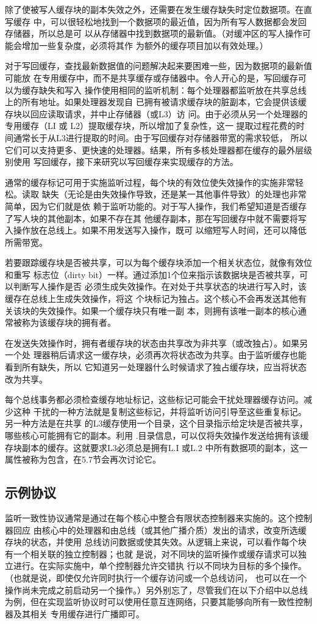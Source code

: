 除了使被写人缓存块的副本失效之外，还需要在发生缓存缺失时定位数据项。在直写缓存
中，可以很轻松地找到一个数据项的最近值，因为所有写人数据都会发回存储器，所以总是可
以从存储器中找到数据项的最新值。（对缓冲区的写人操作可能会增加一些复杂度，必须将其作
为额外的缓存项目加以有效处理。）

对于写回缓存，查找最新数据值的问题解决起来要困难一些，因为数据项的最新值可能放
在专用缓存中，而不是共享缓存或存储器中。令人开心的是，写回缓存可以为缓存缺失和写入
操作使用相同的监听机制：每个处理器都监听放在共享总线上的所有地址。如果处理器发现自
已拥有被请求缓存块的脏副本，它会提供该缓存块以回应读取请求，并中止存储器（或L3）访
问。由于必须从另一个处理器的专用缓存（LI 或 L2）提取缓存块，所以增加了复杂性，这一
提取过程花费的时间通常长于从L3进行提取的时间。由于写回缓存对存储器带宽的需求较低，
所以它们可以支持更多、更快速的处理器。结果，所有多核处理器都在缓存的最外层级别使用
写回缓存，接下来研究以写回缓存来实现缓存的方法。

通常的缓存标记可用于实施监听过程，每个块的有效位使失效操作的实施非常轻松。读取
缺失（无论是由失效操作导致，还是某一其他事件导致）的处理也非常简单，因为它们就是依
赖于监听功能的。对于写人操作，我们希望知道是否缓存了写人块的其他副本，如果不存在其
他缓存副本，那在写回缓存中就不需要将写入操作放在总线上。如果不用发送写入操作，既可
以缩短写人时间，还可以降低所需带宽。

若要跟踪缓存块是否被共享，可以为每个缓存块添加一个相关状态位，就像有效位和重写
标志位（dirty bit）一样。通过添加1个位来指示该数据块是否被共享，可以判断写人操作是否
必须生成失效操作。在对处于共享状态的块进行写入时，该缓存在总线上生成失效操作，将这
个块标记为独占。这个核心不会再发送其他有关该块的失效操作。如果一个缓存块只有唯一副
本，则拥有该唯一副本的核心通常被称为该缓存块的拥有者。

在发送失效操作时，拥有者缓存块的状态由共享改为非共享（或改独占）。如果另一个处
理器稍后请求这一缓存块，必须再次将状态改为共享。由于监听缓存也能看到所有缺失，所以
它知道另一处理器什么时候请求了独占缓存块，应当将状态改为共享。

每个总线事务都必须检查缓存地址标记，这些标记可能会干扰处理器缓存访问。减少这种
干扰的一种方法就是复制这些标记，并将监听访问引导至这些重复标记。另一种方法是在共享
的L3缓存使用一个目录，这个目录指示给定块是否被共享，哪些核心可能拥有它的副本。利用
.目录信息，可以仅将失效操作发送给拥有该缓存块副本的缓存。这就要求L3必须总是拥有L.I
或L.2 中所有数据项的副本，这一属性被称为包含，在5.7节会再次讨论它。
\subsection{示例协议}
监听一致性协议通常是通过在每个核心中整合有限状态控制器来实施的。这个控制器回应
由核心中的处理器和由总线（或其他广播介质）发出的请求，改变所选缓存块的状态，并使用
总线访问数据或使其失效。从逻辑上来说，可以看作每个块有一个相关联的独立控制器；也就
是说，对不同块的监听操作或缓存请求可以独立进行。在实际实施中，单个控制器允许交错执
行以不同块为目标的多个操作。（也就是说，即使仅允许同时执行一个缓存访问或一个总线访问，
也可以在一个操作尚未完成之前启动另一个操作。）另外别忘了，尽管我们在以下介绍中以总线
为例，但在实现监听协议时可以使用任意互连网络，只要其能够向所有一致性控制器及其相关
专用缓存进行广播即可。

